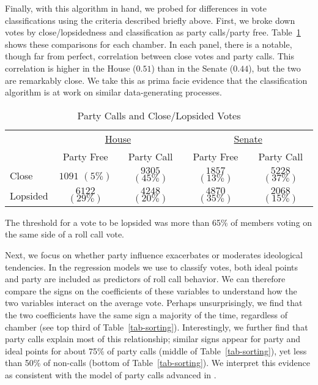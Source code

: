 \documentclass[12pt]{article}
\begin{document}
Finally, with this algorithm in hand, we probed for differences in vote
classifications using the criteria described briefly above.
First, we broke down votes by close/lopsidedness and classification as party
calls/party free.
Table~\ref{tab-close-lop} shows these comparisons for each chamber.
In each panel, there is a notable, though far from perfect, correlation between
close votes and party calls.
This correlation is higher in the House ($0.51$) than in the Senate ($0.44$),
but the two are remarkably close.  We take this as prima facie evidence that
the classification algorithm is at work on similar data-generating processes.

\begin{table}[!htbp]
\centering
\begin{threeparttable}
\singlespacing
\caption{Party Calls and Close/Lopsided Votes}
\label{tab-close-lop}
\begin{tabular}{l cc|cc}
\hline
&\multicolumn{2}{c}{\underline{House}}&\multicolumn{2}{c}{\underline{Senate}}\\
         & Party Free      & Party Call      & Party Free      & Party Call  \\
\hline
Close    & $1091$ $( 5\%)$& $9305$ $(45\%)$& $1857$ $(13\%)$& $5228$ $(37\%)$\\
Lopsided & $6122$ $(29\%)$& $4248$ $(20\%)$& $4870$ $(35\%)$& $2068$ $(15\%)$\\
\hline
\end{tabular}
\begin{tablenotes}
   \item
   The threshold for a vote to be lopsided was more than 65\% of members voting
   on the same side of a roll call vote.
 \end{tablenotes}
\end{threeparttable}
\end{table}

Next, we focus on whether party influence exacerbates or moderates ideological
tendencies.
In the regression models we use to classify votes, both ideal points and party
are included as predictors of roll call behavior.
We can therefore compare the signs on the coefficients of these variables to
understand how the two variables interact on the average vote.
Perhaps unsurprisingly, we find that the two coefficients have the same sign a
majority of the time, regardless of chamber (see top third of
Table~\ref{tab-sorting}).
Interestingly, we further find that party calls explain most of this
relationship; similar signs appear for party and ideal points for about 75\% of
party calls (middle of Table~\ref{tab-sorting}), yet less than 50\% of
non-calls (bottom of Table~\ref{tab-sorting}).
We interpret this evidence as consistent with the model of party calls advanced
in \cite{Minozzi:2013}.
\end{document}
